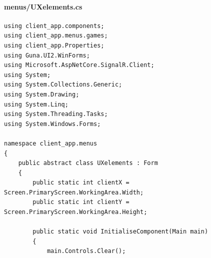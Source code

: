 \documentclass{article}
\begin{document}
\paragraph{menus/UXelements.cs}\label{client/menus/uxelements.cs}
\begin{verbatim}
using client_app.components;
using client_app.menus.games;
using client_app.Properties;
using Guna.UI2.WinForms;
using Microsoft.AspNetCore.SignalR.Client;
using System;
using System.Collections.Generic;
using System.Drawing;
using System.Linq;
using System.Threading.Tasks;
using System.Windows.Forms;

namespace client_app.menus
{
	public abstract class UXelements : Form
	{
		public static int clientX = Screen.PrimaryScreen.WorkingArea.Width;
		public static int clientY = Screen.PrimaryScreen.WorkingArea.Height;

		public static void InitialiseComponent(Main main)
		{
			main.Controls.Clear();


\end{verbatim}
\end{document}
